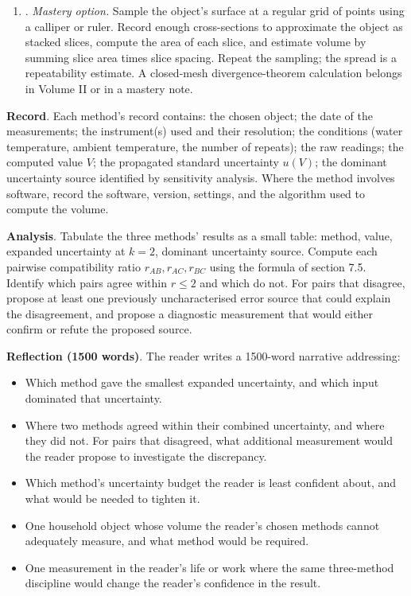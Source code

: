 \begin{project}
\begin{enumerate}[leftmargin=*]
    repeatability estimate rather than a traceable photogrammetry
    uncertainty.
  \item {}.
    \textit{Mastery option.} Sample the object's surface at a
    regular grid of points using a calliper or ruler. Record enough
    cross-sections to approximate the object as stacked slices,
    compute the area of each slice, and estimate volume by summing
    slice area times slice spacing. Repeat the sampling; the spread
    is a repeatability estimate. A closed-mesh divergence-theorem
    calculation belongs in Volume II or in a mastery note.
\end{enumerate}

\textbf{Record}. Each method's record contains: the chosen object;
the date of the measurements; the instrument(s) used and their
resolution; the conditions (water temperature, ambient temperature,
the number of repeats); the raw readings; the computed value $V$;
the propagated standard uncertainty $u(V)$; the dominant uncertainty
source identified by sensitivity analysis. Where the method involves
software, record the software, version, settings, and the algorithm
used to compute the volume.

\textbf{Analysis}. Tabulate the three methods' results as a small
table: method, value, expanded uncertainty at $k = 2$, dominant
uncertainty source. Compute each pairwise compatibility ratio
$r_{AB}, r_{AC}, r_{BC}$ using the formula of section 7.5. Identify
which pairs agree within $r \leq 2$ and which do not. For pairs that
disagree, propose at least one previously uncharacterised error
source that could explain the disagreement, and propose a
diagnostic measurement that would either confirm or refute the
proposed source.

\textbf{Reflection (1500 words)}. The reader writes a 1500-word
narrative addressing:

\begin{itemize}[leftmargin=*]
  \item Which method gave the smallest expanded uncertainty, and
    which input dominated that uncertainty.
  \item Where two methods agreed within their combined uncertainty,
    and where they did not. For pairs that disagreed, what
    additional measurement would the reader propose to investigate
    the discrepancy.
  \item Which method's uncertainty budget the reader is least
    confident about, and what would be needed to tighten it.
  \item One household object whose volume the reader's chosen
    methods cannot adequately measure, and what method would be
    required.
  \item One measurement in the reader's life or work where the
    same three-method discipline would change the reader's
    confidence in the result.
\end{itemize}


\end{project}
